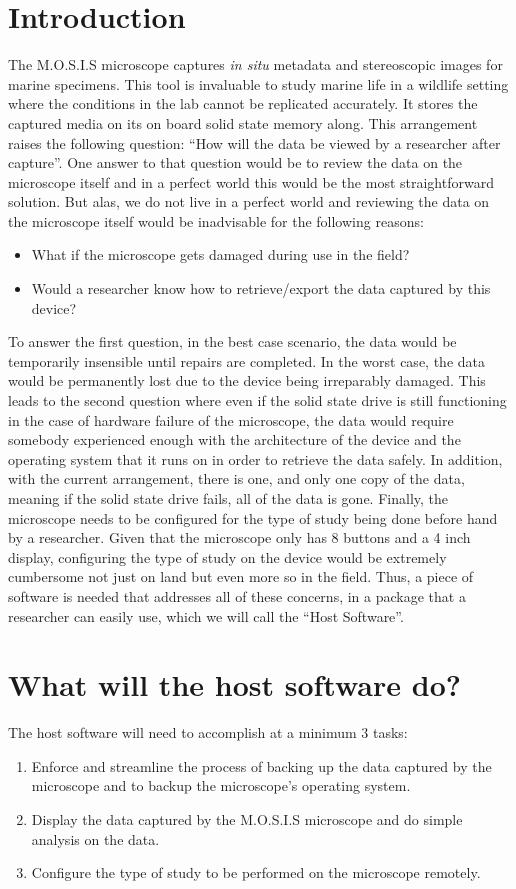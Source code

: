 \documentclass[12pt]{article}
\begin{document}

\tableofcontents
\listoffigures
\newpage
\section{Introduction}
The M.O.S.I.S microscope captures \textit{in situ} metadata and stereoscopic images for marine specimens. This tool is invaluable to study marine life in a wildlife setting where the conditions in the lab cannot be replicated accurately. It stores the captured media on its on board solid state memory along. This arrangement raises the following question: ``How will the data be viewed by a researcher after capture''. One answer to that question would be to review the data on the microscope itself and in a perfect world this would be the most straightforward solution. But alas, we do not live in a perfect world and reviewing the data on the microscope itself would be inadvisable for the following reasons:
\begin{itemize}
\item What if the microscope gets damaged during use in the field?
\item Would a researcher know how to retrieve/export the data captured by this device?
\end{itemize}
To answer the first question, in the best case scenario, the data would be temporarily insensible until repairs are completed. In the worst case, the data would be permanently lost due to the device being irreparably damaged. This leads to the second question where even if the solid state drive is still functioning in the case of hardware failure of the microscope, the data would require somebody experienced enough with the architecture of the device and the operating system that it runs on in order to retrieve the data safely. In addition, with the current arrangement, there is one, and only one copy of the data, meaning if the solid state drive fails, all of the data is gone. Finally, the microscope needs to be configured for the type of study being done before hand by a researcher. Given that the microscope only has 8 buttons and a 4 inch display, configuring the type of study on the device would be extremely cumbersome not just on land but even more so in the field. Thus, a piece of software is needed that addresses all of these concerns, in a package that a researcher can easily use, which we will call the ``Host Software''.
\section{What will the host software do?}
The host software will need to accomplish at a minimum 3 tasks:
\begin{enumerate}
\item Enforce and streamline the process of backing up the data captured by the microscope and to backup the microscope's operating system.
\item Display the data captured by the M.O.S.I.S microscope and do simple analysis on the data.
  \item Configure the type of study to be performed on the microscope remotely.
\end{enumerate}
\end{document}

